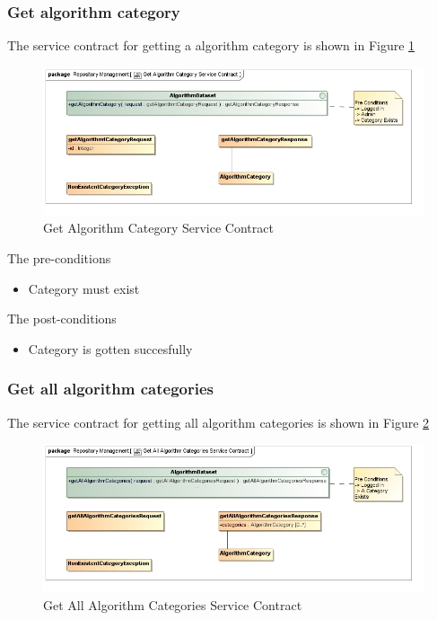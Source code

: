 \subsubsection {Get algorithm category}

The service contract for getting a algorithm category is shown in Figure \ref{fig:getAlgorithmCatService}
\begin{figure}[H]
  \begin{center}
  \includegraphics[scale=0.6]{../Diagrams and Charts/Test Data/Get Algorithm Category Service Contract.jpg}
  \caption{Get Algorithm Category Service Contract}
  \label{fig:getAlgorithmCatService}
  \end{center}
  
\end{figure}

The pre-conditions
\begin{itemize}
  \item Category must exist
\end{itemize}

The post-conditions
\begin{itemize}
  \item Category is gotten succesfully
\end{itemize}

\subsubsection {Get all algorithm categories}

The service contract for getting all algorithm categories is shown in Figure \ref{fig:getAllAlgorithmCatService}
\begin{figure}[H]
  \begin{center}
  \includegraphics[scale=0.6]{../Diagrams and Charts/Test Data/Get All Algorithm Categories Service Contract.jpg}
  \caption{Get All Algorithm Categories Service Contract}
  \label{fig:getAllAlgorithmCatService}
  \end{center}
  
\end{figure}

